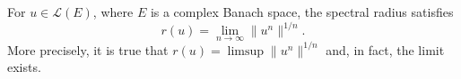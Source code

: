 For $u \in \mathcal{L}(E)$, where $E$ is a complex Banach space, the spectral radius satisfies
$$r(u) = \lim_{n \to \infty} \|u^n\|^{1/n}.$$
More precisely, it is true that $r(u) = \limsup \|u^n\|^{1/n}$ and, in fact, the limit exists.
